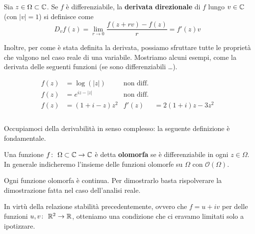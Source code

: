 \begin{definition}
	Sia $z \in \Omega \subset \mathbb{C}$. Se $f$ è differenziabile, la \textbf{derivata direzionale} di $f$ lungo $v \in \mathbb{C}$ (con $|v| = 1$) si definisce come
	\begin{equation}
		D_v f(z) = \lim_{r \to 0} \frac{f(z + rv) - f(z)}{r} = f'(z) v
	\end{equation}
\end{definition}


Inoltre, per come è stata definita la derivata, possiamo sfruttare tutte le proprietà che valgono nel caso reale di una variabile. Mostriamo alcuni esempi, come la derivata delle seguenti funzioni (se sono differenziabili \dots).

	\begin{equation*} 
	\begin{aligned}
		f(z) & = \log(|z|) 			& \text{non diff.} &  \\
		f(z) & = e^{iz - |z|} 		& \text{non diff.} & \\
		f(z) & = (1 + i - z)z^2  	& f'(z) & = 2(1+i)z - 3z^2 \\
	\end{aligned} 
	\end{equation*}
\\

Occupiamoci della derivabilità in senso complesso: la seguente definizione è fondamentale.

\begin{definition}
	Una funzione $f \colon\ \Omega \subset \mathbb{C} \rightarrow \mathbb{C}$ è detta \textbf{olomorfa} se è differenziabile in ogni $z \in \Omega$. In generale indicheremo l'insieme delle funzioni olomorfe su $\Omega$ con $\mathcal{O}(\Omega)$.
\end{definition}

\begin{remark}
	Ogni funzione olomorfa è continua. Per dimostrarlo basta rispolverare la dimostrazione fatta nel caso dell'analisi reale.
\end{remark}

In virtù della relazione stabilità precedentemente, ovvero che $f = u + iv$ per delle funzioni $u,v \colon\ \mathbb{R}^2 \rightarrow \mathbb{R}$, otteniamo una condizione che ci eravamo limitati solo a ipotizzare.

